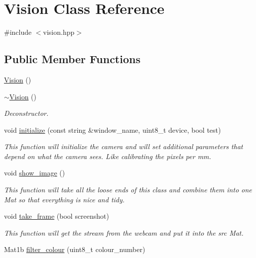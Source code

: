 \hypertarget{class_vision}{}\section{Vision Class Reference}
\label{class_vision}


{\ttfamily \#include $<$vision.\+hpp$>$}

\subsection*{Public Member Functions}
\begin{DoxyCompactItemize}
\item 
\hyperlink{class_vision_ad6899fb359fd485afbd309d6d7b0ae1f}{Vision} ()
\item 
\hyperlink{class_vision_a12bc039b4fcdb229e70c55d2660392a8}{$\sim$\+Vision} ()
\begin{DoxyCompactList}\small\item\em Deconstructor. \end{DoxyCompactList}\item 
void \hyperlink{class_vision_afc55887fac6cea0954963cff0429a705}{initialize} (const string \&window\+\_\+name, uint8\+\_\+t device, bool test)
\begin{DoxyCompactList}\small\item\em This function will initialize the camera and will set additional parameters that depend on what the camera sees. Like calibrating the pixels per mm. \end{DoxyCompactList}\item 
void \hyperlink{class_vision_aefb980ea81da98b4f5531cd46481ce2d}{show\+\_\+image} ()
\begin{DoxyCompactList}\small\item\em This function will take all the loose ends of this class and combine them into one Mat so that everything is nice and tidy. \end{DoxyCompactList}\item 
void \hyperlink{class_vision_afbaa5efe06c5af3d82fb4fc133788b5b}{take\+\_\+frame} (bool screenshot)
\begin{DoxyCompactList}\small\item\em This function will get the stream from the webcam and put it into the src Mat. \end{DoxyCompactList}\item 
Mat1b \hyperlink{class_vision_a10439f626238ba3628534e55f80e59b1}{filter\+\_\+colour} (uint8\+\_\+t colour\+\_\+number)

\end{DoxyCompactItemize}
